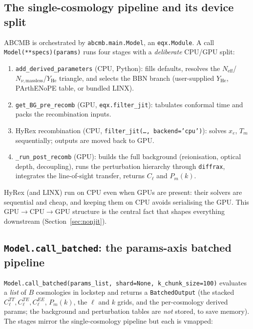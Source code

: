 \documentclass[11pt]{article}
\newcommand{\code}[1]{\texttt{\small #1}}
\newcommand{\Neff}{N_{\mathrm{eff}}}
\newcommand{\Cl}{C_\ell}
\begin{document}
\subsection{The single-cosmology pipeline and its device split}
\label{sec:pipeline}

\textsc{ABCMB} is orchestrated by \code{abcmb.main.Model}, an
\code{eqx.Module}. A call \code{Model(**specs)(params)} runs four
stages with a \emph{deliberate} CPU/GPU split:
\begin{enumerate}[leftmargin=2em,itemsep=2pt]
\item \code{add\_derived\_parameters} (CPU, Python): fills defaults,
resolves the $\Neff$/$N_{\nu,\mathrm{massless}}$/$Y_{\mathrm{He}}$
triangle, and selects the BBN branch (user-supplied $Y_{\mathrm{He}}$,
PArthENoPE table, or bundled LINX).
\item \code{get\_BG\_pre\_recomb} (GPU, \code{eqx.filter\_jit}): tabulates
conformal time and packs the recombination inputs.
\item HyRex recombination (CPU, \code{filter\_jit(\dots, backend='cpu')}):
solves $x_e$, $T_m$ sequentially; outputs are moved back to GPU.
\item \code{\_run\_post\_recomb} (GPU): builds the full background
(reionisation, optical depth, decoupling), runs the perturbation
hierarchy through \code{diffrax}, integrates the line-of-sight transfer,
returns $\Cl$ and $P_m(k)$.
\end{enumerate}
HyRex (and LINX) run on CPU even when GPUs are present: their solvers are
sequential and cheap, and keeping them on CPU avoids serialising the GPU.
This GPU$\to$CPU$\to$GPU structure is the central fact that shapes
everything downstream (Section~\ref{sec:nonjit}).

\subsection{\texttt{Model.call\_batched}: the params-axis batched pipeline}
\label{sec:callbatched}

\code{Model.call\_batched(params\_list, shard=None, k\_chunk\_size=100)}
evaluates a \emph{list} of $B$ cosmologies in lockstep and returns a
\code{BatchedOutput} (the stacked $\Cl^{TT},\Cl^{TE},\Cl^{EE}$, $P_m(k)$,
the $\ell$ and $k$ grids, and the per-cosmology derived params; the
background and perturbation tables are \emph{not} stored, to save memory).
The stages mirror the single-cosmology pipeline but each is vmapped:
\end{document}

